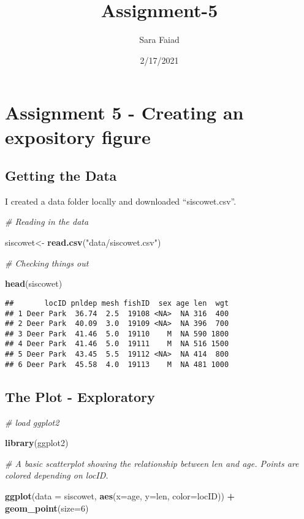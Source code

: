 \documentclass[
]{article}
\title{Assignment-5}
\author{Sara Faiad}
\date{2/17/2021}
\newenvironment{Shaded}{\begin{snugshade}}{\end{snugshade}}
\newcommand{\CommentTok}[1]{\textcolor[rgb]{0.56,0.35,0.01}{\textit{#1}}}
\newcommand{\DataTypeTok}[1]{\textcolor[rgb]{0.13,0.29,0.53}{#1}}
\newcommand{\DecValTok}[1]{\textcolor[rgb]{0.00,0.00,0.81}{#1}}
\newcommand{\KeywordTok}[1]{\textcolor[rgb]{0.13,0.29,0.53}{\textbf{#1}}}
\newcommand{\NormalTok}[1]{#1}
\newcommand{\OperatorTok}[1]{\textcolor[rgb]{0.81,0.36,0.00}{\textbf{#1}}}
\newcommand{\StringTok}[1]{\textcolor[rgb]{0.31,0.60,0.02}{#1}}
\begin{document}
\maketitle

\hypertarget{assignment-5---creating-an-expository-figure}{%
\section{Assignment 5 - Creating an expository
figure}\label{assignment-5---creating-an-expository-figure}}

\hypertarget{getting-the-data}{%
\subsection{Getting the Data}\label{getting-the-data}}

I created a data folder locally and downloaded ``siscowet.csv''.

\begin{Shaded}
\begin{Highlighting}[]
\CommentTok{# Reading in the data }

\NormalTok{siscowet<-}\StringTok{ }\KeywordTok{read.csv}\NormalTok{(}\StringTok{"data/siscowet.csv"}\NormalTok{)}

\CommentTok{# Checking things out }

\KeywordTok{head}\NormalTok{(siscowet)}
\end{Highlighting}
\end{Shaded}

\begin{verbatim}
##       locID pnldep mesh fishID  sex age len  wgt
## 1 Deer Park  36.74  2.5  19108 <NA>  NA 316  400
## 2 Deer Park  40.09  3.0  19109 <NA>  NA 396  700
## 3 Deer Park  41.46  5.0  19110    M  NA 590 1800
## 4 Deer Park  41.46  5.0  19111    M  NA 516 1500
## 5 Deer Park  43.45  5.5  19112 <NA>  NA 414  800
## 6 Deer Park  45.58  4.0  19113    M  NA 481 1000
\end{verbatim}

\hypertarget{the-plot---exploratory}{%
\subsection{The Plot - Exploratory}\label{the-plot---exploratory}}

\begin{Shaded}
\begin{Highlighting}[]
\CommentTok{# load ggplot2}

\KeywordTok{library}\NormalTok{(ggplot2)}


\CommentTok{# A basic scatterplot showing the relationship between len and age. Points are colored depending on locID. }

\KeywordTok{ggplot}\NormalTok{(}\DataTypeTok{data =}\NormalTok{ siscowet, }\KeywordTok{aes}\NormalTok{(}\DataTypeTok{x=}\NormalTok{age, }\DataTypeTok{y=}\NormalTok{len, }\DataTypeTok{color=}\NormalTok{locID)) }\OperatorTok{+}\StringTok{ }
\StringTok{    }\KeywordTok{geom_point}\NormalTok{(}\DataTypeTok{size=}\DecValTok{6}\NormalTok{) }
\end{Highlighting}
\end{Shaded}
\end{document}
